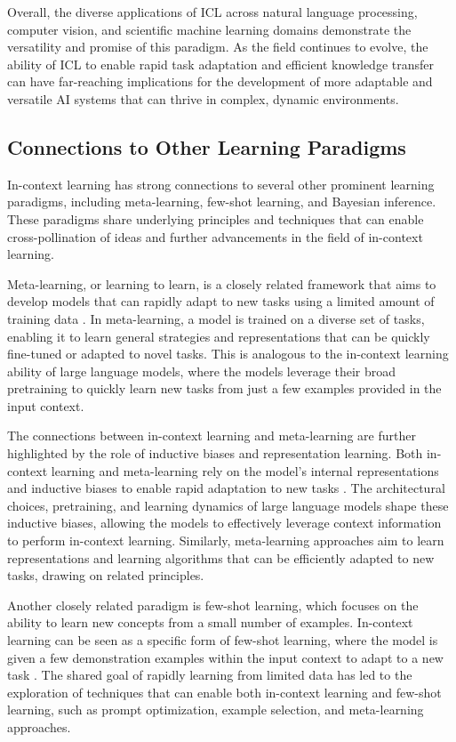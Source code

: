 \documentclass[11pt]{article}
\begin{document}
Overall, the diverse applications of ICL across natural language processing, computer vision, and scientific machine learning domains demonstrate the versatility and promise of this paradigm. As the field continues to evolve, the ability of ICL to enable rapid task adaptation and efficient knowledge transfer can have far-reaching implications for the development of more adaptable and versatile AI systems that can thrive in complex, dynamic environments.

\subsection{Connections to Other Learning Paradigms}

In-context learning has strong connections to several other prominent learning paradigms, including meta-learning, few-shot learning, and Bayesian inference. These paradigms share underlying principles and techniques that can enable cross-pollination of ideas and further advancements in the field of in-context learning.

Meta-learning, or learning to learn, is a closely related framework that aims to develop models that can rapidly adapt to new tasks using a limited amount of training data \cite{ref29}. In meta-learning, a model is trained on a diverse set of tasks, enabling it to learn general strategies and representations that can be quickly fine-tuned or adapted to novel tasks. This is analogous to the in-context learning ability of large language models, where the models leverage their broad pretraining to quickly learn new tasks from just a few examples provided in the input context.

The connections between in-context learning and meta-learning are further highlighted by the role of inductive biases and representation learning. Both in-context learning and meta-learning rely on the model's internal representations and inductive biases to enable rapid adaptation to new tasks \cite{ref30}. The architectural choices, pretraining, and learning dynamics of large language models shape these inductive biases, allowing the models to effectively leverage context information to perform in-context learning. Similarly, meta-learning approaches aim to learn representations and learning algorithms that can be efficiently adapted to new tasks, drawing on related principles.

Another closely related paradigm is few-shot learning, which focuses on the ability to learn new concepts from a small number of examples. In-context learning can be seen as a specific form of few-shot learning, where the model is given a few demonstration examples within the input context to adapt to a new task \cite{ref31}. The shared goal of rapidly learning from limited data has led to the exploration of techniques that can enable both in-context learning and few-shot learning, such as prompt optimization, example selection, and meta-learning approaches.
\end{document}
